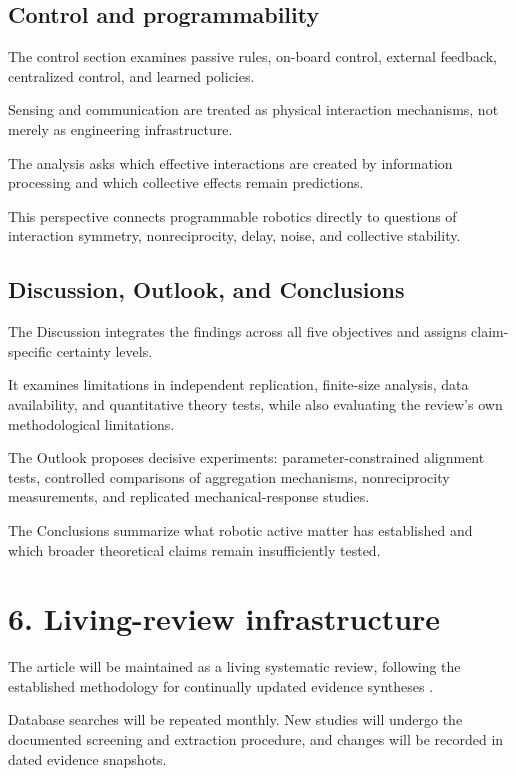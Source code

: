 \subsection*{Control and programmability}

The control section examines passive rules,
on-board control, external feedback,
centralized control, and learned policies.

Sensing and communication are treated
as physical interaction mechanisms,
not merely as engineering infrastructure.

The analysis asks which effective
interactions are created by
information processing and which
collective effects remain predictions.

This perspective connects programmable
robotics directly to questions of
interaction symmetry, nonreciprocity,
delay, noise, and collective stability.

\subsection*{Discussion, Outlook, and Conclusions}

The Discussion integrates the findings
across all five objectives and assigns
claim-specific certainty levels.

It examines limitations in independent
replication, finite-size analysis,
data availability, and quantitative
theory tests, while also evaluating
the review's own methodological limitations.

The Outlook proposes decisive experiments:
parameter-constrained alignment tests,
controlled comparisons of aggregation
mechanisms, nonreciprocity measurements,
and replicated mechanical-response studies.

The Conclusions summarize what robotic
active matter has established and
which broader theoretical claims
remain insufficiently tested.

\section*{6. Living-review infrastructure}

The article will be maintained as a living
systematic review, following the established
methodology for continually updated
evidence syntheses
\cite{Elliott2014living,Elliott2017living}.

Database searches will be repeated monthly.
New studies will undergo the documented
screening and extraction procedure,
and changes will be recorded in
dated evidence snapshots.

